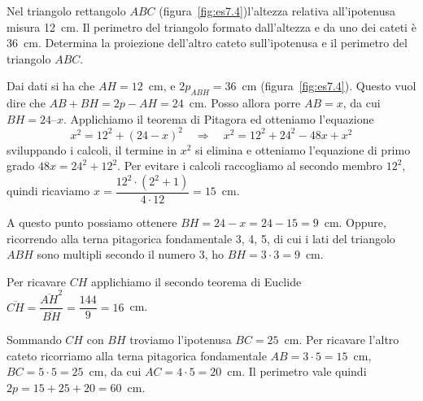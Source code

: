 
\begin{esempio}\label{es:7.5}

Nel triangolo rettangolo \(ABC\) (figura~\ref{fig:es7.4})l'altezza relativa 
all'ipotenusa misura 12~cm. 
Il perimetro del triangolo formato dall'altezza e da uno 
dei cateti è 36~cm. Determina la proiezione dell'altro cateto 
sull'ipotenusa e il perimetro del triangolo \(ABC\).\vspace{7pt}


Dai dati si ha che \(AH = 12\)~cm, e \(2p_{ABH} = 36\)~cm 
(figura~\ref{fig:es7.4}).
Questo vuol dire che \(AB + BH = 2p - AH = 24\)~cm. 
Posso allora porre \(AB = x\), da cui \(BH = 24 – x\).
Applichiamo il teorema di Pitagora ed otteniamo l'equazione
\[x^2 = 12^2 + (24 - x)^2 \quad\Rightarrow\quad x^2 = 12^2 + 24^2 - 
48x + x^2\]
sviluppando i calcoli, il termine in \(x^2\) si elimina e otteniamo 
l'equazione di primo grado \(48x = 24^2 + 12^2\).
Per evitare i calcoli raccogliamo al secondo membro \(12^2\), quindi 
ricaviamo \(x=\dfrac{12^2\cdot\left(2^2+1\right)}{4\cdot 12}=15\)~cm.

A questo punto possiamo ottenere \(BH = 24-x = 24-15 = 9\)~cm. Oppure, 
ricorrendo alla terna pitagorica fondamentale 3, 4, 5, di cui i lati 
del triangolo \(ABH\) sono multipli secondo il numero 3, ho \(BH = 3 
\cdot 3 = 9\)~cm.

Per ricavare \(CH\) applichiamo il secondo teorema di Euclide 
\(\overline{CH}=\dfrac{\overline{AH}^2}{\overline{BH}}=\dfrac{144}{9}
=16\)~cm.

Sommando \(CH\) con \(BH\) troviamo l'ipotenusa \(BC=25\)~cm. Per ricavare 
l'altro cateto ricorriamo alla terna pitagorica fondamentale 
\(AB=3\cdot 5=15\)~cm, \(BC=5\cdot 5=25\)~cm, da cui \(AC=4\cdot 5=20\)~cm.
Il perimetro vale quindi \(2p=15+25+20=60\)~cm.
\end{esempio}


